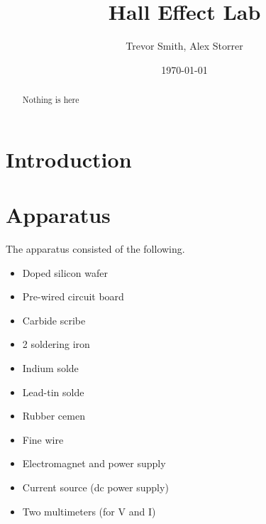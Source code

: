\documentclass[aps,prl,reprint]{revtex4-2}
\begin{document}

\title{Hall Effect Lab}


\author{Trevor Smith, Alex Storrer}


\date{\today}

\begin{abstract}
	Nothing is here
\end{abstract}


\maketitle

\section{Introduction}

\section{Apparatus}

The apparatus consisted of the following.

\begin{itemize}
	\item Doped silicon wafer
	\item Pre-wired circuit board
	\item Carbide scribe
	\item 2 soldering iron
	\item Indium solde
	\item Lead-tin solde
	\item Rubber cemen
	\item Fine wire
	\item Electromagnet and power supply
	\item Current source (dc power supply)
	\item Two multimeters (for V and I)
\end{itemize}
\end{document}
